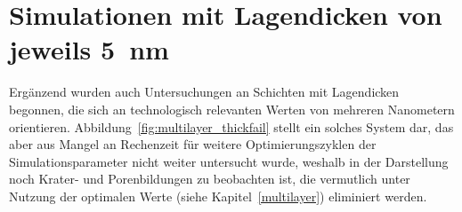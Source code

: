 \section{Simulationen mit Lagendicken von jeweils \texorpdfstring{\SI{5}{\nano\meter}}{5 nm}}

Ergänzend wurden auch Untersuchungen an Schichten mit Lagendicken begonnen, die sich an technologisch relevanten Werten von mehreren Nanometern orientieren.
Abbildung~\ref{fig:multilayer_thickfail} stellt ein solches System dar, das aber aus Mangel an Rechenzeit für weitere Optimierungszyklen der Simulationsparameter nicht weiter untersucht wurde, weshalb in der Darstellung noch Krater- und Porenbildungen zu beobachten ist, die vermutlich unter Nutzung der optimalen Werte (siehe Kapitel~\ref{multilayer}) eliminiert werden.
